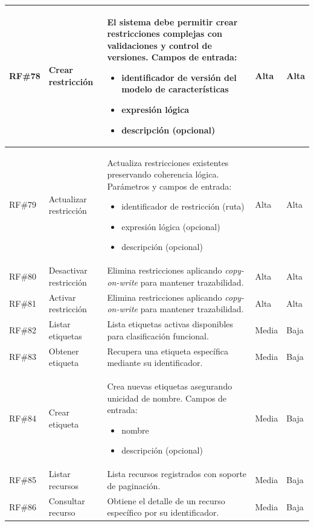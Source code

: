 \begin{longtable}{|p{1cm}|p{4cm}|p{5.2cm}|p{1.9cm}|p{1.9cm}|}
	\hline
	\ac{RF}\#78 & Crear restricción & El sistema debe permitir crear restricciones complejas con validaciones y control de versiones. Campos de entrada:
		\begin{itemize}
			\item identificador de versión del modelo de características
			\item expresión lógica
			\item descripción (opcional)
		\end{itemize}
	& Alta & Alta \\
	\hline
	\rowcolor[HTML]{EDEBF1}
	\ac{RF}\#79 & Actualizar restricción & Actualiza restricciones existentes preservando coherencia lógica. Parámetros y campos de entrada:
		\begin{itemize}
			\item identificador de restricción (ruta)
			\item expresión lógica (opcional)
			\item descripción (opcional)
		\end{itemize}
	& Alta & Alta \\
	\hline
	\ac{RF}\#80 & Desactivar restricción & Elimina restricciones aplicando \textit{copy-on-write} para mantener trazabilidad. & Alta & Alta \\
	\hline
	\rowcolor[HTML]{EDEBF1}
	\ac{RF}\#81 & Activar restricción & Elimina restricciones aplicando \textit{copy-on-write} para mantener trazabilidad. & Alta & Alta \\
	\hline
	\ac{RF}\#82 & Listar etiquetas & Lista etiquetas activas disponibles para clasificación funcional. & Media & Baja \\
	\hline
	\rowcolor[HTML]{EDEBF1}
	\ac{RF}\#83 & Obtener etiqueta & Recupera una etiqueta específica mediante su identificador. & Media & Baja \\
	\hline
	\ac{RF}\#84 & Crear etiqueta & Crea nuevas etiquetas asegurando unicidad de nombre. Campos de entrada:
		\begin{itemize}
			\item nombre
			\item descripción (opcional)
		\end{itemize}
	& Media & Baja \\
	\hline
	\rowcolor[HTML]{EDEBF1}
	\ac{RF}\#85 & Listar recursos & Lista recursos registrados con soporte de paginación. & Media & Baja \\
	\hline
	\ac{RF}\#86 & Consultar recurso & Obtiene el detalle de un recurso específico por su identificador. & Media & Baja \\

\end{longtable}
